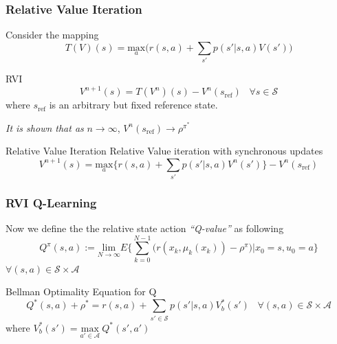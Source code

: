\documentclass{beamer}
\begin{document}

\begin{frame}
\frametitle{Relative Value Iteration}
Consider the mapping
\[T(V)(s) = \underset{a}{\text{max}} \Big(r(s,a)+\sum_{s'}p(s'|s,a)V(s') \Big)\]

\begin{block}{RVI}
\begin{equation}
    V^{n+1}(s) = T(V^n)(s)-V^n(s_{\text{ref}})  \hspace{10pt}\forall s\in\mathcal{S}\nonumber
\end{equation}
where $s_{\text{ref}}$ is an arbitrary but fixed reference state. \\
\begin{center}
    \textit{It is shown that as} $n\rightarrow\infty$, $V^n(s_{\text{ref}})\rightarrow \rho^{\pi^*}$
\end{center}
\end{block}
\end{frame}

\begin{frame}{Relative Value Iteration}
Relative Value iteration with synchronous updates
    \[V^{n+1}(s) = \underset{a}{\text{max}}\Big\{r(s,a)+\sum_{s'}p(s'|s,a)V^n(s')\Big\} - V^n(s_{\text{ref}})\]
\end{frame}


\begin{frame}
\frametitle{RVI Q-Learning}
Now we define the the relative state action \textit{``Q-value''} as following\\
\[
    Q^{\pi}(s,a) := \underset{N\rightarrow\infty}{\text{lim}} E\Big\{\sum_{k=0}^{N-1}\Big(r(x_k,\mu_k(x_k))-\rho^\pi\Big)|x_0=s,u_0=a\Big\}\]
$\forall (s,a)\in \mathcal{S}\times\mathcal{A}$ 

\begin{block}{Bellman Optimality Equation for Q}
\[
    Q^*(s,a)+\rho^* = r(s,a)+\sum_{s'\in\mathcal{S}}p(s'|s,a)V_b^*(s') \hspace{10pt} \forall (s,a)\in \mathcal{S}\times\mathcal{A}\] 
where $V_b^*(s') = \underset{a'\in\mathcal{A}}{\text{max}}\ Q^*(s',a')$
\end{block}
\end{frame}


\end{document}
